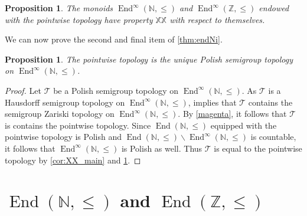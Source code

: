 \documentclass[11pt]{amsart}
\newtheorem{proposition}[theorem]{Proposition}
\theoremstyle{definition}
\newcommand{\N}{\mathbb N}
\newcommand{\Tau}{\mathcal T}
\newcommand{\Zendd}{\operatorname{End}(\mathbb Z, \leq)}
\newcommand{\Z}{\mathbb Z}
\begin{document}
\begin{proposition}\label{XXD1}
 The monoids $\operatorname{End}^\infty(\N,\leq)$ and $\operatorname{End}^\infty(\Z,\leq)$ endowed with the pointwise topology have property $\mathbb{XX}$ with respect to themselves.  
\end{proposition}

We can now prove the second and final item of \cref{thm:endNi}.

\begin{proposition}\label{maximum}
      The pointwise topology is the unique Polish semigroup topology on $\operatorname{End}^\infty(\N,\leq)$. 
\end{proposition}
\begin{proof}
Let \(\Tau\) be a Polish semigroup topology on \(\operatorname{End}^\infty(\N,\leq)\). As \(\Tau\) is a Hausdorff semigroup topology on \(\operatorname{End}^\infty(\N,\leq)\), \cite[Proposition 2.1]{main} implies that \(\Tau\) contains the semigroup Zariski topology on \(\operatorname{End}^\infty(\N,\leq)\). By \cref{magenta}, it follows that \(\Tau\) is contains the pointwise topology. Since $\operatorname{End}(\N,\leq)$ equipped with the pointwise topology is Polish and $\operatorname{End}(\N,\leq)\backslash \operatorname{End}^\infty(\N,\leq)$ is countable, it follows that $\operatorname{End}^\infty(\N,\leq)$ is Polish as well.
Thus \(\Tau\) is equal to the pointwise topology by \cref{cor:XX_main} and \cref{XXD1}.
    \end{proof}


    
\section{\(\operatorname{End}(\N, \leq)\) and $\Zendd$ }
\end{document}
